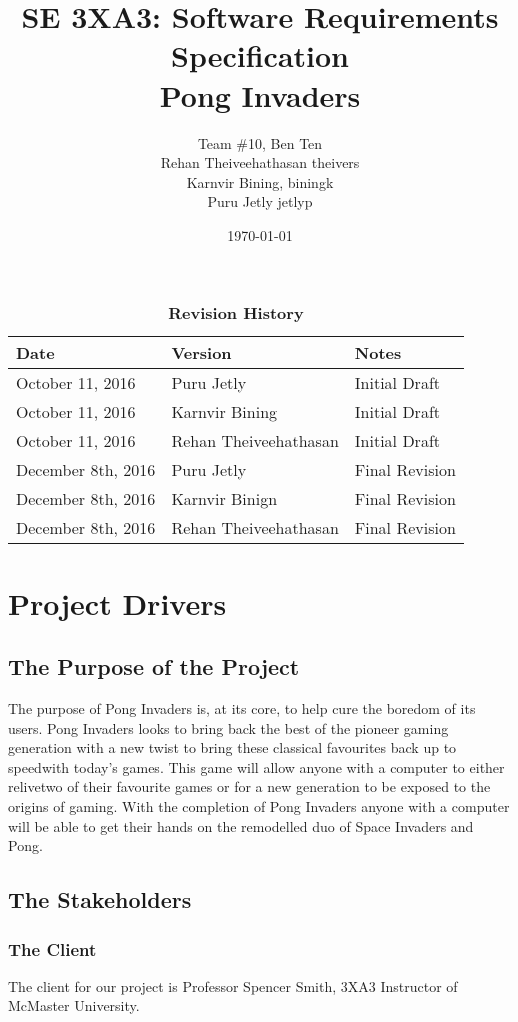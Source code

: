 \documentclass[12pt, titlepage]{article}
\title{SE 3XA3: Software Requirements Specification\\Pong Invaders}
\author{Team \#10, Ben Ten
		\\ Rehan Theiveehathasan theivers
		\\ Karnvir Bining, biningk 
		\\ Puru Jetly jetlyp
}
\date{\today}
\begin{document}
\maketitle
{}
\tableofcontents
\listoftables
\listoffigures
\begin{table}[h]
\caption{\bf Revision History}
\begin{tabularx}{\textwidth}{p{3cm}p{2cm}X}
\toprule {\bf Date} & {\bf Version} & {\bf Notes}\\
\midrule
October 11, 2016  & Puru Jetly & Initial Draft\\
October 11, 2016  & Karnvir Bining & Initial Draft\\
October 11, 2016  & Rehan Theiveehathasan & Initial Draft\\
\midrule
December 8th, 2016 & Puru Jetly & Final Revision\\
December 8th, 2016 & Karnvir Binign  & Final Revision\\
December 8th, 2016 & Rehan Theiveehathasan & Final Revision\\
\bottomrule
\end{tabularx}
\end{table}
\newpage
{}
\section{Project Drivers}
\subsection{The Purpose of the Project}
The purpose of Pong Invaders is, at its core, to help cure the boredom of its
users. Pong Invaders looks to bring back the best of the pioneer gaming
generation with a new twist to bring these classical favourites back up to
speedwith today’s games. This game will allow anyone with a computer to either
relivetwo of their favourite games or for a new generation to be exposed to the
origins of gaming. With the completion of Pong Invaders anyone with a computer
will be able to get their hands on the remodelled duo of Space Invaders and
Pong.
\subsection{The Stakeholders}
\subsubsection{The Client}
The client for our project is Professor Spencer Smith, 3XA3 Instructor of
McMaster University.
\end{document}
